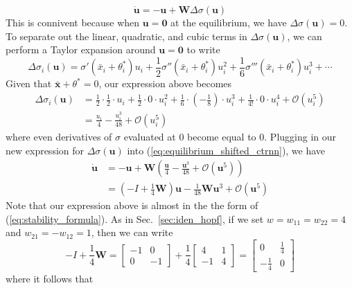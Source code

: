 \documentclass[11pt, letterpaper]{article}
\begin{document}
\begin{equation}\label{eq:equilibrium_shifted_ctrnn}
    \dot{\mathbf{u}} = -\mathbf{u}+\mathbf{W} \Delta\sigma(\mathbf{u})
\end{equation}
This is connivent because when $\mathbf{u}=\mathbf{0}$ at the equilibrium, we have $\Delta\sigma(\mathbf{u})=0$. To separate out the linear, quadratic, and cubic terms in $\Delta\sigma(\mathbf{u})$, we can perform a Taylor expansion around $\mathbf{u}=\mathbf{0}$ to write
\[
\Delta\sigma_i(\mathbf{u})=\sigma'\left(\bar{x}_i+\theta^\ast_i\right)u_i + \frac{1}{2}\sigma''\left(\bar{x}_i+\theta^\ast_i\right)u^2_i + \frac{1}{6}\sigma'''\left(\bar{x}_i+\theta^\ast_i\right)u^3_i + \cdots
\]
Given that $\bar{\mathbf{x}}+\theta^\ast=0$, our expression above becomes
\begin{align*}
    \Delta\sigma_i(\mathbf{u})&=\frac{1}{2}\cdot\frac{1}{2}\cdot u_i + \frac{1}{2}\cdot 0 \cdot u^2_i + \frac{1}{6}\cdot \left(-\frac{1}{8}\right) \cdot u^3_i + \frac{1}{4!}\cdot 0 \cdot  u^4_i + \mathcal{O}( u^5_i)\\
    &=\frac{u_i}{4} - \frac{u^3_i}{48} + \mathcal{O}( u^5_i)
\end{align*}
where even derivatives of $\sigma$ evaluated at $0$ become equal to $0$. Plugging in our new expression for $\Delta\sigma(\mathbf{u})$ into (\ref{eq:equilibrium_shifted_ctrnn}), we have
\begin{align*}
    \dot{\mathbf{u}} &= -\mathbf{u}+\mathbf{W} \left( \frac{\mathbf{u}}{4} - \frac{\mathbf{u}^3}{48} + \mathcal{O}( \mathbf{u}^5) \right) \\
    &= \left( -I + \frac{1}{4} \mathbf{W} \right)\mathbf{u}-\frac{1}{48}\mathbf{W}\mathbf{u}^3 + \mathcal{O}( \mathbf{u}^5)
\end{align*}
Note that our expression above is almost in the the form of (\ref{eq:stability_formula}). As in Sec.~\ref{sec:iden_hopf}, if we set $w=w_{11}=w_{22}=4$ and $w_{21}=-w_{12}=1$, then we can write
\[
-I + \frac{1}{4} \mathbf{W}=\begin{bmatrix}
    -1&0\\0& -1
\end{bmatrix} + \frac{1}{4}\begin{bmatrix}
    4 & 1\\ -1 & 4
\end{bmatrix}=\begin{bmatrix}
    0 & \frac{1}{4}\\-\frac{1}{4} & 0
\end{bmatrix}
\]
where it follows that
\end{document}
